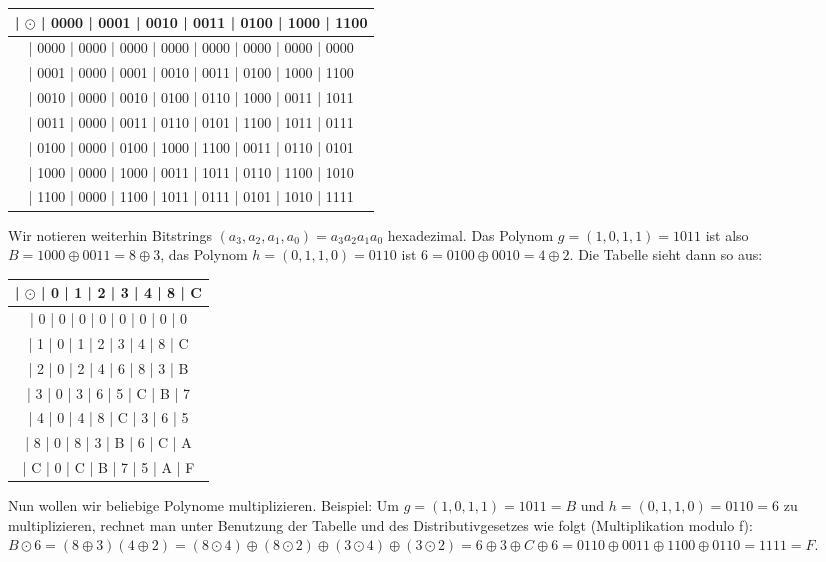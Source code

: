 \documentclass[a4paper]{article}
\begin{document}
\begin{multicols}{3}
    \begin{tabular}{c}
        | $\odot$ | 0000 | 0001 | 0010 | 0011 | 0100 | 1000 | 1100 \\\hline
        | 0000  | 0000 | 0000 | 0000 | 0000 | 0000 | 0000 | 0000   \\
        | 0001  | 0000 | 0001 | 0010 | 0011 | 0100 | 1000 | 1100   \\
        | 0010  | 0000 | 0010 | 0100 | 0110 | 1000 | 0011 | 1011   \\
        | 0011  | 0000 | 0011 | 0110 | 0101 | 1100 | 1011 | 0111   \\
        | 0100  | 0000 | 0100 | 1000 | 1100 | 0011 | 0110 | 0101   \\
        | 1000  | 0000 | 1000 | 0011 | 1011 | 0110 | 1100 | 1010   \\
        | 1100  | 0000 | 1100 | 1011 | 0111 | 0101 | 1010 | 1111
    \end{tabular}

    Wir notieren weiterhin Bitstrings $(a_3,a_2,a_1,a_0)=a_3a_2a_1a_0$ hexadezimal. Das Polynom $g=(1,0,1,1)=1011$ ist also $B=1000\oplus 0011=8\oplus 3$, das Polynom $h=(0,1,1,0)=0110$ ist $6=0100\oplus 0010=4\oplus 2$.
    Die Tabelle sieht dann so aus:
    \begin{tabular}{c}
        | $\odot$ | 0  | 1  | 2  | 3  | 4  | 8  | C \\\hline
        | 0    | 0  | 0  | 0  | 0  | 0  | 0  | 0    \\
        | 1    | 0  | 1  | 2  | 3  | 4  | 8  | C    \\
        | 2    | 0  | 2  | 4  | 6  | 8  | 3  | B    \\
        | 3    | 0  | 3  | 6  | 5  | C  | B  | 7    \\
        | 4    | 0  | 4  | 8  | C  | 3  | 6  | 5    \\
        | 8    | 0  | 8  | 3  | B  | 6  | C  | A    \\
        | C    | 0  | C  | B  | 7  | 5  | A  | F
    \end{tabular}

    Nun wollen wir beliebige Polynome multiplizieren. Beispiel: Um $g=(1,0,1,1)=1011=B$ und $h=(0,1,1,0)=0110=6$ zu multiplizieren, rechnet man unter Benutzung der Tabelle und des Distributivgesetzes wie folgt (Multiplikation modulo f):
    $B\odot 6=(8\oplus 3)(4\oplus 2)=(8\odot 4)\oplus(8\odot 2)\oplus(3\odot 4)\oplus(3\odot 2)=6\oplus 3\oplus C\oplus 6= 0110\oplus 0011 \oplus 1100 \oplus 0110 = 1111 = F$.


\end{multicols}
\end{document}
